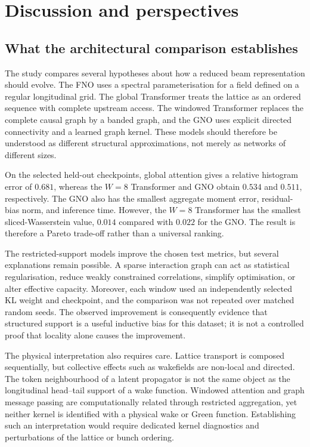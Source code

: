 \section{Discussion and perspectives}
\label{sec:discussion}

\subsection{What the architectural comparison establishes}
\label{subsec:exploratory_inductive_bias}

The study compares several hypotheses about how a reduced beam representation should evolve. The FNO uses a spectral parameterisation for a field defined on a regular longitudinal grid. The global Transformer treats the lattice as an ordered sequence with complete upstream access. The windowed Transformer replaces the complete causal graph by a banded graph, and the GNO uses explicit directed connectivity and a learned graph kernel. These models should therefore be understood as different structural approximations, not merely as networks of different sizes.

On the selected held-out checkpoints, global attention gives a relative histogram error of $0.681$, whereas the $W=8$ Transformer and GNO obtain $0.534$ and $0.511$, respectively. The GNO also has the smallest aggregate moment error, residual-bias norm, and inference time. However, the $W=8$ Transformer has the smallest sliced-Wasserstein value, $0.014$ compared with $0.022$ for the GNO. The result is therefore a Pareto trade-off rather than a universal ranking.

The restricted-support models improve the chosen test metrics, but several explanations remain possible. A sparse interaction graph can act as statistical regularisation, reduce weakly constrained correlations, simplify optimisation, or alter effective capacity. Moreover, each window used an independently selected KL weight and checkpoint, and the comparison was not repeated over matched random seeds. The observed improvement is consequently evidence that structured support is a useful inductive bias for this dataset; it is not a controlled proof that locality alone causes the improvement.

The physical interpretation also requires care. Lattice transport is composed sequentially, but collective effects such as wakefields are non-local and directed. The token neighbourhood of a latent propagator is not the same object as the longitudinal head--tail support of a wake function. Windowed attention and graph message passing are computationally related through restricted aggregation, yet neither kernel is identified with a physical wake or Green function. Establishing such an interpretation would require dedicated kernel diagnostics and perturbations of the lattice or bunch ordering.

